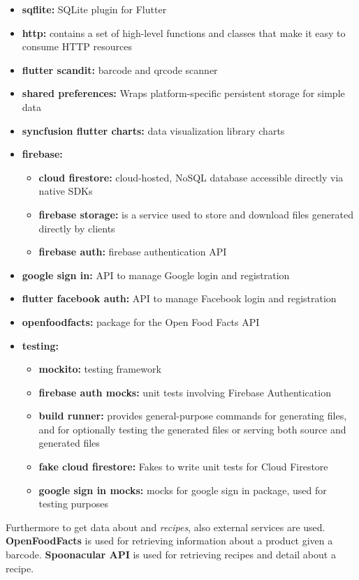 \begin{itemize}
    \item \textbf{sqflite: }SQLite plugin for Flutter
    
    \item \textbf{http: }contains a set of high-level functions and classes that make it easy to consume HTTP resources
    
    \item \textbf{flutter scandit: }barcode and qrcode scanner
    
    \item \textbf{shared preferences: }Wraps platform-specific persistent storage for simple data 
    
    \item \textbf{syncfusion flutter charts: }data visualization library charts
    
    \item \textbf{firebase: }
    \begin{itemize}
        \item \textbf{cloud firestore: }cloud-hosted, NoSQL database accessible directly via native SDKs
        \item \textbf{firebase storage: }is a service used to store and download files generated directly by clients
        \item \textbf{firebase auth: }firebase authentication API
    \end{itemize}
    
    \item \textbf{google sign in: }API to manage Google login and registration
    \item \textbf{flutter facebook auth: }API to manage Facebook login and registration
    \item \textbf{openfoodfacts: }package for the Open Food Facts API
    
    \item \textbf{testing: }
    \begin{itemize}
        \item \textbf{mockito: }testing framework
        \item \textbf{firebase auth mocks: }unit tests involving Firebase Authentication
        \item \textbf{build runner: }provides general-purpose commands for generating files, and for optionally testing the generated files or serving both source and generated files
        \item \textbf{fake cloud firestore: }Fakes to write unit tests for Cloud Firestore
        \item \textbf{google sign in mocks: }mocks for google sign in package, used for testing purposes
    \end{itemize}
    
\end{itemize}

Furthermore to get data about  and \textit{recipes}, also external services are used.
\textbf{OpenFoodFacts }is used for retrieving information about a product given a barcode.
\textbf{Spoonacular API} is used for retrieving recipes and detail about a recipe.
